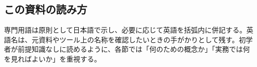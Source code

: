\subsection*{この資料の読み方}

専門用語は原則として日本語で示し、必要に応じて英語を括弧内に併記する。英語名は、元資料やツール上の名称を確認したいときの手がかりとして残す。初学者が前提知識なしに読めるように、各節では「何のための概念か」「実務では何を見ればよいか」を重視する。
